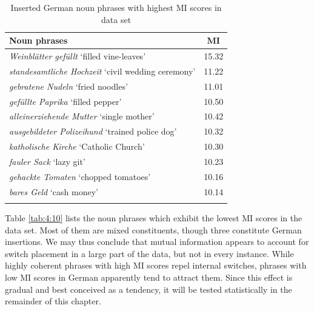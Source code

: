 \begin{table}
		\begin{tabular}{lr}
		\lsptoprule
			Noun phrases	& \multicolumn{1}{c}{MI} \\\midrule
			\textit{Weinblätter gefüllt	} `filled vine-leaves'	&15.32\\
			\textit{standesamtliche Hochzeit} `civil wedding ceremony'	&11.22\\
			\textit{gebratene Nudeln} `fried noodles'	&11.01\\
			\textit{gefüllte Paprika} `filled pepper'	&10.50\\
			\textit{alleinerziehende Mutter} `single mother'	&10.42\\
			\textit{ausgebildeter Polizeihund}	`trained police dog'	&10.32\\
			\textit{katholische Kirche} `Catholic Church'	&10.30\\
			\textit{fauler Sack} `lazy git'		&10.23\\
			\textit{gehackte Tomaten} `chopped tomatoes'	&10.16\\
			\textit{bares Geld}	 `cash money'	&10.14\\
			\lspbottomrule 
		\end{tabular}
\caption{Inserted German noun phrases with highest MI scores in data set\label{tab:4:9}} 
\end{table}


Table \ref{tab:4:10} lists the noun phrases which exhibit the lowest MI scores in the data set. Most of them are mixed constituents, though three constitute German insertions. We may thus conclude that mutual information appears to account for switch placement in a large part of the data, but not in every instance. While highly coherent phrases with high MI scores repel internal switches, phrases with low MI scores in German apparently tend to attract them. Since this effect is gradual and best conceived as a tendency, it will be tested statistically in the remainder of this chapter.

